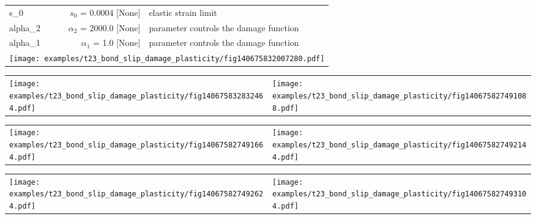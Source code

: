 \documentclass[main.tex]{subfiles}
\begin{document}
\begin{bmcsexample}
\begin{center}
\begin{tabular}{lrp{4cm}}
s\_0 & $s_0$ = 0.0004 [None] & {\footnotesize elastic strain limit}  \\
            alpha\_2 & $\alpha_2$ = 2000.0 [None] & {\footnotesize parameter controls the damage function}  \\
            alpha\_1 & $\alpha_1$ = 1.0 [None] & {\footnotesize parameter controls the damage function}  \\
            
\multicolumn{3}{r}{\texttt{[image: examples/t23\_bond\_slip\_damage\_plasticity/fig140675832007280.pdf]}}\\
\hline \end{tabular}


\end{center}

\noindent
\begin{tabular}{L{7.5cm}L{7.5cm}}
\texttt{[image: examples/t23\_bond\_slip\_damage\_plasticity/fig140675832832464.pdf]}
 & 
\texttt{[image: examples/t23\_bond\_slip\_damage\_plasticity/fig140675827491088.pdf]}
 \\\end{tabular}

\noindent
\begin{tabular}{L{7.5cm}L{7.5cm}}
\texttt{[image: examples/t23\_bond\_slip\_damage\_plasticity/fig140675827491664.pdf]}
 & 
\texttt{[image: examples/t23\_bond\_slip\_damage\_plasticity/fig140675827492144.pdf]}
 \\\end{tabular}

\noindent
\begin{tabular}{L{7.5cm}L{7.5cm}}
\texttt{[image: examples/t23\_bond\_slip\_damage\_plasticity/fig140675827492624.pdf]}
 & 
\texttt{[image: examples/t23\_bond\_slip\_damage\_plasticity/fig140675827493104.pdf]}
 \\\end{tabular}

\end{bmcsexample}
\end{document}
